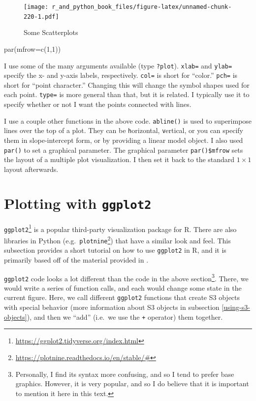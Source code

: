 \documentclass[
  12pt,
  krantz2]{krantz}
\makeatletter
\newenvironment{Shaded}{\begin{snugshade}}{\end{snugshade}}
\newcommand{\AttributeTok}[1]{\textcolor[rgb]{0.61,0.61,0.61}{#1}}
\newcommand{\DecValTok}[1]{\textcolor[rgb]{0.06,0.06,0.06}{#1}}
\newcommand{\FunctionTok}[1]{\textcolor[rgb]{0,0,0}{#1}}
\newcommand{\NormalTok}[1]{#1}
\renewcommand{\href}[2]{#2\footnote{\url{#1}}}
\newenvironment{kframe}{%
\medskip{}
\setlength{\fboxsep}{.8em}
 \def\at@end@of@kframe{}%
 \ifinner\ifhmode%
  \def\at@end@of@kframe{\end{minipage}}%
  \begin{minipage}{\columnwidth}%
 \fi\fi%
 \def\FrameCommand##1{\hskip\@totalleftmargin \hskip-\fboxsep
 \colorbox{shadecolor}{##1}\hskip-\fboxsep
     \hskip-\linewidth \hskip-\@totalleftmargin \hskip\columnwidth}%
 \MakeFramed {\advance\hsize-\width
   \@totalleftmargin\z@ \linewidth\hsize
   \@setminipage}}%
 {\par\unskip\endMakeFramed%
 \at@end@of@kframe}
\renewenvironment{Shaded}{\begin{kframe}}{\end{kframe}}
\makeatother
\begin{document}
\begin{figure}
\centering
\texttt{[image: r\_and\_python\_book\_files/figure-latex/unnamed-chunk-220-1.pdf]}
\caption{\label{fig:unnamed-chunk-220}Some Scatterplots}
\end{figure}

\begin{Shaded}
\begin{Highlighting}[]
\FunctionTok{par}\NormalTok{(}\AttributeTok{mfrow=}\FunctionTok{c}\NormalTok{(}\DecValTok{1}\NormalTok{,}\DecValTok{1}\NormalTok{))}
\end{Highlighting}
\end{Shaded}

I use some of the many arguments available (type \texttt{?plot}). \texttt{xlab=} and \texttt{ylab=} specify the x- and y-axis labels, respectively. \texttt{col=} is short for ``color.'' \texttt{pch=} is short for ``point character.'' Changing this will change the symbol shapes used for each point. \texttt{type=} is more general than that, but it is related. I typically use it to specify whether or not I want the points connected with lines.

I use a couple other functions in the above code. \texttt{abline()} is used to superimpose lines over the top of a plot. They can be \texttt{h}orizontal, \texttt{v}ertical, or you can specify them in slope-intercept form, or by providing a linear model object. I also used \texttt{par()} to set a graphical parameter. The graphical parameter \texttt{par()\$mfrow} sets the layout of a multiple plot visualization. I then set it back to the standard \(1 \times 1\) layout afterwards.

\hypertarget{plotting-with-ggplot2}{%
\section{\texorpdfstring{Plotting with \texttt{ggplot2}}{Plotting with ggplot2}}\label{plotting-with-ggplot2}}

\href{https://ggplot2.tidyverse.org/index.html}{\texttt{ggplot2}} is a popular third-party visualization package for R. There are also libraries in Python (e.g.~\href{https://plotnine.readthedocs.io/en/stable/\#}{\texttt{plotnine}}) that have a similar look and feel. This subsection provides a short tutorial on how to use \texttt{ggplot2} in R, and it is primarily based off of the material provided in \citep{ggplot2}.

\texttt{ggplot2} code looks a lot different than the code in the above section\footnote{Personally, I find its syntax more confusing, and so I tend to prefer base graphics. However, it is very popular, and so I do believe that it is important to mention it here in this text.}. There, we would write a series of function calls, and each would change some state in the current figure. Here, we call different \texttt{ggplot2} functions that create S3 objects with special behavior (more information about S3 objects in subsection \ref{using-s3-objects}), and then we ``add'' (i.e.~we use the \texttt{+} operator) them together.
\end{document}
